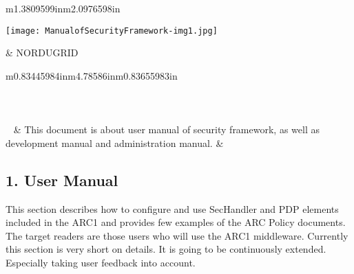 \documentclass{article}
\title{}
\begin{document}
\begin{flushleft}
\tablehead{}\begin{supertabular}{m{1.3809599in}m{2.0976598in}}
\begin{center}
\texttt{[image: ManualofSecurityFramework-img1.jpg]}
\end{center}
 &
\scshape\color{black} \newline
\newline
NORDUGRID\\
\end{supertabular}
\end{flushleft}

\bigskip


\bigskip

\begin{flushleft}
\tablehead{}\begin{supertabular}{m{0.83445984in}m{4.78586in}m{0.83655983in}}
\\
\\
\\
\\
~
 &
\color{black} This document is about user manual
of security framework, as well as development manual and administration
manual. &
~
\\
\end{supertabular}
\end{flushleft}

\setcounter{tocdepth}{9}
\renewcommand\contentsname{}
\tableofcontents

\bigskip

\bigskip

\bigskip
\clearpage\clearpage\setcounter{page}{1}\pagestyle{Convertv}

\bigskip

\subsection{1. User Manual}
{\color{black}
This section describes how to configure and use SecHandler and PDP
elements included in the ARC1 and provides few examples of the ARC
Policy documents. The target readers are those users who will use the
ARC1 middleware. Currently this section is very short on details. It is
going to be continuously extended. Especially taking user feedback into
account.}
\end{document}
